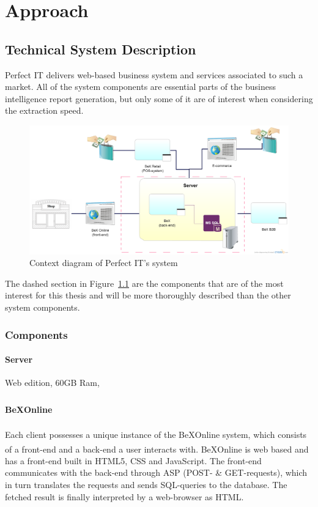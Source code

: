 \documentclass{cslthse-msc}
\newcommand{\bex}{BeX\textsuperscript{\textregistered}}
\begin{document}
\chapter{Approach}

\section{Technical System Description}
Perfect IT delivers web-based business system and services associated to such a market. All of the system components are essential parts of the business intelligence report generation, but only some of it are of interest when considering the extraction speed.
\begin{figure}[H]
\vspace{-15pt}
  \begin{center}
    \includegraphics[scale=0.3]{Systemdesc.png}
  \end{center}
  \caption{Context diagram of Perfect IT's system}
  \label{context}
  \vspace{-15pt}
\end{figure}
\noindent The dashed section in Figure~\ref{context} are the components that are of the most interest for this thesis and will be more thoroughly described than the other system components.

\subsection{Components}


\subsubsection{Server}
Web edition, 60GB Ram, 
\subsubsection{\bex Online}
Each client possesses a unique instance of the \bex Online system, which consists of a front-end and a back-end a user interacts with. \bex Online is web based and has a front-end built in HTML5, CSS and JavaScript. The front-end communicates with the back-end through ASP (POST- \& GET-requests), which in turn translates the requests and sends SQL-queries to the database. The fetched result is finally interpreted by a web-browser as HTML. 
\end{document}

